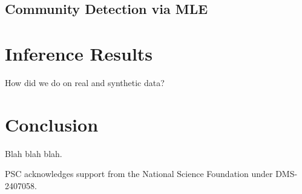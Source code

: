 \documentclass[aps,pre,reprint,superscriptaddress,nofootinbib]{revtex4-2}
\begin{document}
\subsection{Community Detection via MLE}



\section{Inference Results}

How did we do on real and synthetic data? 




\section{Conclusion}
Blah blah blah. 

\begin{acknowledgments}
PSC acknowledges support from the National Science Foundation under DMS-2407058.
\end{acknowledgments}


 
\end{document}
